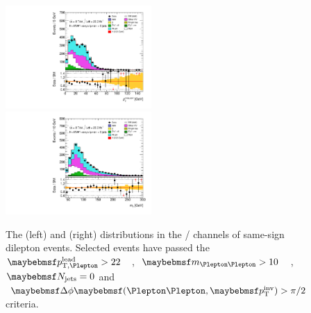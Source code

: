 \begin{figure}
	\includegraphics[width=0.495\textwidth]{tex/backgrounds/emme_CutDijetControl_0jet_MET_TrackHWW_Clj_zoom_mh125_SS_lin}
	\hfill
	\includegraphics[width=0.495\textwidth]{tex/backgrounds/emme_CutDijetControl_0jet_MT_TrackHWW_Clj_mh125_SS_lin}
	\caption{The \corrtrackmet (left) and \mt (right) distributions in the \emch/\mech 
	channels of same-sign dilepton events. Selected events have passed the 
	\unit{$\ptleadlep > 22$}{\GeV}, \unit{$\mll > 10$}{\GeV}, $\njets = 0$ and 
	$\dphillmet > \pi/2$ criteria.}
	\label{fig:dijet_vr}
\end{figure}
